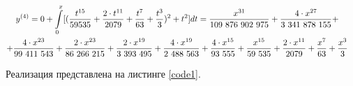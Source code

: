 \begin{multline}\label{formula11}
	\shoveright
	{
	\begin{gathered}
		y^{(4)} = 0 + \int\limits_0^x [(\frac{t^{15}}{59535} + \frac{2\cdot t^{11}}{2079} + \frac{t^7}{63} + \frac{t^3}{3})^2 + t^2]dt
		= \frac{x^{31}}{109 876 902 975} + \frac{4\cdot x^{27}}{3 341 878 155} + \\ + \frac{4\cdot x^{23}}{99 411 543} + \frac{2\cdot x^{23}}{86 266 215} + \frac{2\cdot x^{19}}{3 393 495} + \frac{4\cdot x^{19}}{2 488 563} + \frac{4\cdot x^{15}}{93 555} + \frac{x^{15}}{59 535} + \frac{2\cdot x^{11}}{2079} + \frac{x^7}{63} + \frac{x^3}{3}
	\end{gathered}
	}
\end{multline}

Реализация представлена на листинге \ref{code1}.\\






